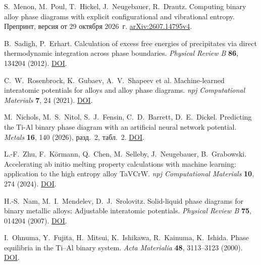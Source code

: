 S.~Menon, M.~Poul, T.~Hickel, J.~Neugebauer, R.~Drautz.
Computing binary alloy phase diagrams with explicit configurational and
vibrational entropy.
Препринт, версия от 29 октября 2026~г.
\href{https://arxiv.org/abs/2607.14795v4}{arXiv:2607.14795v4}.

B.~Sadigh, P.~Erhart.
Calculation of excess free energies of precipitates via direct thermodynamic
integration across phase boundaries.
\emph{Physical Review B} \textbf{86}, 134204 (2012).
\href{https://doi.org/10.1103/PhysRevB.86.134204}{DOI}.

C.~W.~Rosenbrock, K.~Gubaev, A.~V.~Shapeev et al.
Machine-learned interatomic potentials for alloys and alloy phase diagrams.
\emph{npj Computational Materials} \textbf{7}, 24 (2021).
\href{https://doi.org/10.1038/s41524-020-00477-2}{DOI}.

M.~Nichols, M.~S.~Nitol, S.~J.~Fensin, C.~D.~Barrett, D.~E.~Dickel.
Predicting the Ti-Al binary phase diagram with an artificial neural network potential.
\emph{Metals} \textbf{16}, 140 (2026), разд.~2, табл.~2.
\href{https://doi.org/10.3390/met16020140}{DOI}.

L.-F.~Zhu, F.~Körmann, Q.~Chen, M.~Selleby, J.~Neugebauer, B.~Grabowski.
Accelerating ab initio melting property calculations with machine learning:
application to the high entropy alloy TaVCrW.
\emph{npj Computational Materials} \textbf{10}, 274 (2024).
\href{https://doi.org/10.1038/s41524-024-01464-7}{DOI}.

H.-S.~Nam, M.~I.~Mendelev, D.~J.~Srolovitz.
Solid-liquid phase diagrams for binary metallic alloys: Adjustable interatomic potentials.
\emph{Physical Review B} \textbf{75}, 014204 (2007).
\href{https://doi.org/10.1103/PhysRevB.75.014204}{DOI}.

I.~Ohnuma, Y.~Fujita, H.~Mitsui, K.~Ishikawa, R.~Kainuma, K.~Ishida.
Phase equilibria in the Ti--Al binary system.
\emph{Acta Materialia} \textbf{48}, 3113--3123 (2000).
\href{https://doi.org/10.1016/S1359-6454(00)00118-X}{DOI}.

